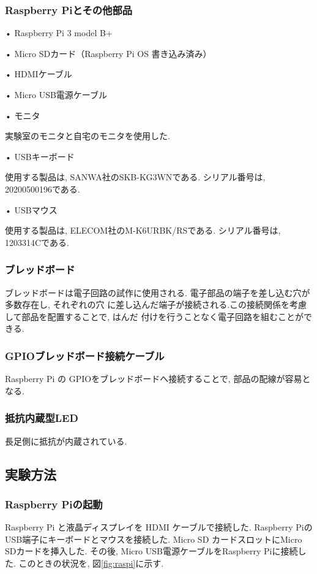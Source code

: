 \documentclass{ltjsarticle} %
\begin{document}
\subsubsection{Raspberry Piとその他部品}
• Raspberry Pi 3 model B+

• Micro SDカード（Raspberry Pi OS 書き込み済み）

• HDMIケーブル

• Micro USB電源ケーブル

• モニタ

実験室のモニタと自宅のモニタを使用した.

• USBキーボード

使用する製品は, SANWA社のSKB-KG3WNである. シリアル番号は, 20200500196である. 

• USBマウス

使用する製品は, ELECOM社のM-K6URBK/RSである. シリアル番号は, 1203314Cである. 


\subsubsection{ブレッドボード}
ブレッドボードは電⼦回路の試作に使⽤される. 電⼦部品の端⼦を差し込む⽳が多数存在し, それぞれの⽳
に差し込んだ端⼦が接続される.この接続関係を考慮して部品を配置することで, はんだ
付けを⾏うことなく電⼦回路を組むことができる.

\subsubsection{GPIOブレッドボード接続ケーブル}
Raspberry Pi の GPIOをブレッドボードへ接続することで, 部品の配線が容易となる.

\subsubsection{抵抗内蔵型LED}
⻑⾜側に抵抗が内蔵されている.

\subsection{実験方法}

\subsubsection{Raspberry Piの起動}
Raspberry Pi と液晶ディスプレイを HDMI ケーブルで接続した. 
Raspberry PiのUSB端⼦にキーボードとマウスを接続した.
Micro SD カードスロットにMicro SDカードを挿⼊した.
その後, Micro USB電源ケーブルをRaspberry Piに接続した.
このときの状況を, 図\ref{fig:raspi}に示す. 
\end{document}
